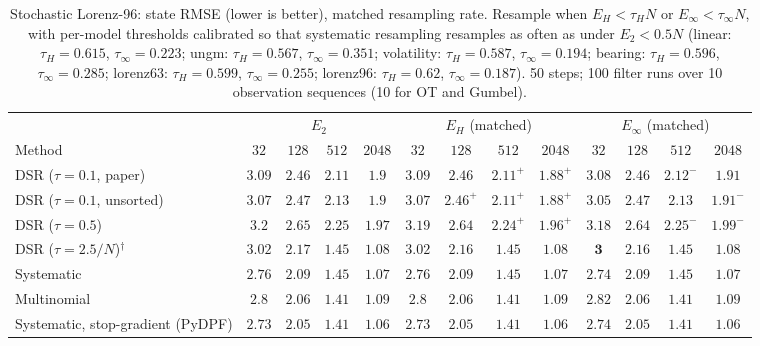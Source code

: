 \begin{table}[ht]
\centering
\small
\caption{Stochastic Lorenz-96: state RMSE (lower is better), matched resampling rate. Resample when $E_H<\tau_HN$ or $E_\infty<\tau_\infty N$, with per-model thresholds calibrated so that systematic resampling resamples as often as under $E_2<0.5N$ (linear: $\tau_H{=}0.615$, $\tau_\infty{=}0.223$; ungm: $\tau_H{=}0.567$, $\tau_\infty{=}0.351$; volatility: $\tau_H{=}0.587$, $\tau_\infty{=}0.194$; bearing: $\tau_H{=}0.596$, $\tau_\infty{=}0.285$; lorenz63: $\tau_H{=}0.599$, $\tau_\infty{=}0.255$; lorenz96: $\tau_H{=}0.62$, $\tau_\infty{=}0.187$). 50 steps; 100 filter runs over 10 observation sequences (10 for OT and Gumbel).}
\label{tab:trigger-matched-lorenz96-rmse}
\begin{adjustbox}{max width=\linewidth}
\begin{tabular}{lcccc|cccc|cccc}
\toprule
 & \multicolumn{4}{c}{$E_2$} & \multicolumn{4}{c}{$E_H$ (matched)} & \multicolumn{4}{c}{$E_\infty$ (matched)} \\
\cmidrule(lr){2-5} \cmidrule(lr){6-9} \cmidrule(lr){10-13}
Method & $32$ & $128$ & $512$ & $2048$ & $32$ & $128$ & $512$ & $2048$ & $32$ & $128$ & $512$ & $2048$ \\
\midrule
DSR ($\tau{=}0.1$, paper) & $3.09$ & $2.46$ & $2.11$ & $1.9$ & $3.09$ & $\mathbf{2.46}$ & $\mathbf{2.11}^{+}$ & $\mathbf{1.88}^{+}$ & $\mathbf{3.08}$ & $2.46$ & $2.12^{-}$ & $1.91$ \\
DSR ($\tau{=}0.1$, unsorted) & $3.07$ & $2.47$ & $2.13$ & $1.9$ & $3.07$ & $\mathbf{2.46}^{+}$ & $\mathbf{2.11}^{+}$ & $\mathbf{1.88}^{+}$ & $\mathbf{3.05}$ & $2.47$ & $2.13$ & $1.91^{-}$ \\
DSR ($\tau{=}0.5$) & $3.2$ & $2.65$ & $2.25$ & $1.97$ & $3.19$ & $\mathbf{2.64}$ & $\mathbf{2.24}^{+}$ & $\mathbf{1.96}^{+}$ & $\mathbf{3.18}$ & $2.64$ & $2.25^{-}$ & $1.99^{-}$ \\
DSR ($\tau{=}2.5/N$)$^\dagger$ & $3.02$ & $2.17$ & $\mathbf{1.45}$ & $1.08$ & $3.02$ & $\mathbf{2.16}$ & $1.45$ & $\mathbf{1.08}$ & $\mathbf{3}$ & $2.16$ & $1.45$ & $1.08$ \\
\midrule
Systematic & $2.76$ & $2.09$ & $1.45$ & $1.07$ & $2.76$ & $\mathbf{2.09}$ & $\mathbf{1.45}$ & $\mathbf{1.07}$ & $\mathbf{2.74}$ & $2.09$ & $1.45$ & $1.07$ \\
Multinomial & $2.8$ & $2.06$ & $\mathbf{1.41}$ & $1.09$ & $\mathbf{2.8}$ & $2.06$ & $1.41$ & $1.09$ & $2.82$ & $\mathbf{2.06}$ & $1.41$ & $\mathbf{1.09}$ \\
Systematic, stop-gradient (PyDPF) & $2.73$ & $\mathbf{2.05}$ & $1.41$ & $\mathbf{1.06}$ & $\mathbf{2.73}$ & $2.05$ & $1.41$ & $\mathbf{1.06}$ & $2.74$ & $2.05$ & $\mathbf{1.41}$ & $1.06$ \\

\end{tabular}
\end{adjustbox}
\end{table}
